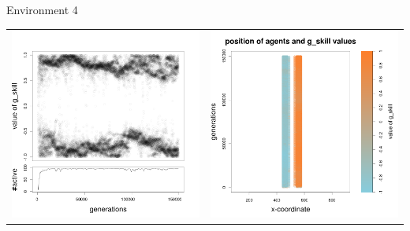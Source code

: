 \documentclass[8pt, handout=show,notes=show]{beamer}
\begin{document}
\begin{frame}{Environment 4}
\begin{table}[H]
\centering
\begin{tabular}{cc}
 \includegraphics[width=\imgSize]{../images/5StaticEnv/Gplot62_staticEnv4}&\includegraphics[width=\imgSize]{../images/5StaticEnv/Gplot62Static_staticEnv4}\\

\end{tabular}
\end{table}
\end{frame}
\end{document}
